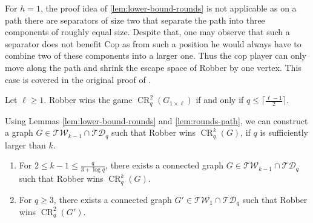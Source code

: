 \documentclass{lmcs}
\theoremstyle{plain}\newtheorem{claim}[thm]{Claim}   %
\DeclareMathOperator{\CR}{CR}
\newcommand{\TW}{\ensuremath{\mathcal{TW}}}
\newcommand{\TD}{\ensuremath{\mathcal{TD}}}
\newcommand{\grid}[2]{\ensuremath{G_{#1 \times #2}}}
\begin{document}
For $h=1$, the proof idea of \autoref{lem:lower-bound-rounds} is not applicable as on a path there are separators of size two that separate the path into three components of roughly equal size.
Despite that, one may observe that such a separator does not benefit Cop as from such a position he would always have to combine two of these components into a larger one.
Thus the cop player can only move along the path and shrink the escape space of Robber by one vertex.
This case is covered in the original proof of \cite{Furer_rounds_2001}.

\begin{lemC}
	\label{lem:rounds-path}
	Let $\ell\geq 1$. Robber wins the game $\CR_q^2(\grid{1}{\ell})$ if and only if $q\leq\lceil \frac{\ell-1}{2}\rceil$.
\end{lemC}

Using Lemmas \ref{lem:lower-bound-rounds} and \ref{lem:rounds-path}, we can construct a graph $G\in\TW_{k-1}\cap\TD_q$ such that Robber wins $\CR_q^k(G)$, if $q$ is sufficiently larger than $k$.

\begin{lem}
	\label{lem:CR_tw-td}\hfill
	\begin{enumerate}
		\item For  $2\leq k-1\leq\frac{q}{3 +\log q}$, there exists a connected graph $G\in\TW_{k-1}\cap\TD_q$ such that Robber wins $\CR_q^k(G)$.
		\item For $q \geq 3$, there exists a connected graph $G'\in \TW_{1}\cap\TD_{q}$ such that Robber wins $\CR_q^2(G')$.
	\end{enumerate}
\end{lem}
\end{document}
